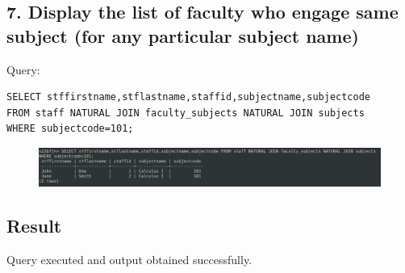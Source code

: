 \documentclass{article}
\begin{document}
\subsection*{7. Display the list of faculty who engage same subject (for any particular subject name)}
Query:
\begin{Verbatim}[frame=single,framerule=1pt,fontfamily=courier,fontsize=\small]
SELECT stffirstname,stflastname,staffid,subjectname,subjectcode 
FROM staff NATURAL JOIN faculty_subjects NATURAL JOIN subjects 
WHERE subjectcode=101;
\end{Verbatim}
\begin{figure}[H]
    \centering
    \includegraphics[width=\textwidth]{cycle4/4.8.png}
\end{figure}

\subsection*{Result}
Query executed and output obtained successfully.

\newpage
\section*{}
\end{document}

